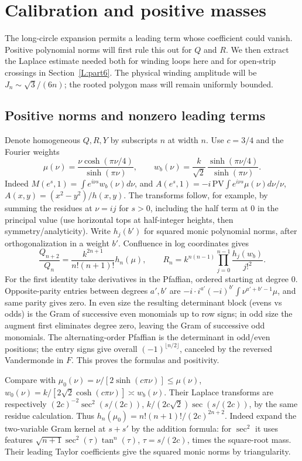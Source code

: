 \documentclass[11pt]{article}
\numberwithin{equation}{section}
\theoremstyle{definition}\newtheorem{definition}[theorem]{Definition}
\theoremstyle{remark}\newtheorem{remark}[theorem]{Remark}
\begin{document}
\section{Calibration and positive masses}\label{L:part4}

The long-circle expansion permits a leading term whose coefficient could
vanish. Positive polynomial norms will first rule this out for $Q$ and $R$.
We then extract the Laplace estimate needed both for winding loops here
and for open-strip crossings in Section~\ref{L:part6}. The physical
winding amplitude will be $J_n\sim\sqrt3/(6n)$; the rooted polygon
mass will remain uniformly bounded.

\subsection{Positive norms and nonzero leading terms}
Denote homogeneous \(Q,R,Y\) by subscripts \(n\) at width \(n\). Use \(c=3/4\) and the Fourier weights
\[
 \mu(\nu)=\frac{\nu\cosh(\pi\nu/4)}{\sinh(\pi\nu)},\qquad
 w_b(\nu)=\frac{k}{\sqrt2}\,\frac{\sinh(\pi\nu/4)}{\sinh(\pi\nu)} .
\]
Indeed \(M(e^s,1)=\int e^{i\nu s}w_b(\nu)d\nu\), and \(A(e^s,1)= -i\,\mathrm{PV}\int e^{i\nu s}\mu(\nu)d\nu/\nu\), \(A(x,y)=(x^2-y^2)/h(x,y)\). The transforms follow, for example, by summing the residues at \(\nu=i j\) for \(s>0\), including the half term at 0 in the principal value (use horizontal tops at half-integer heights, then symmetry/analyticity). Write \(h_j(b')\) for squared monic polynomial norms, after orthogonalization in a weight \(b'\). Confluence in log coordinates gives
\[
 \frac{Q_{n+2}}{Q_n}=\frac{k^{2n+1}}{n!(n+1)!} h_n(\mu),\qquad
 R_n=k^{n(n-1)}\prod_{j=0}^{n-1}\frac{h_j(w_b)}{j!^2}.
\]
For the first identity take derivatives in the Pfaffian, ordered starting at degree 0. Opposite-parity entries between degrees \(a',b'\) are \(-i\cdot i^{a'}(-i)^{b'}\int\nu^{a'+b'-1}\mu\), and same parity gives zero. In even size the resulting determinant block (evens vs odds) is the Gram of successive even monomials up to row signs; in odd size the augment first eliminates degree zero, leaving the Gram of successive odd monomials. The alternating-order Pfaffian is the determinant in odd/even positions; the entry signs give overall \((-1)^{\lfloor n/2\rfloor}\), canceled by the reversed Vandermonde in \(F\). This proves the formulas and positivity.

Compare with
\(\mu_0(\nu)=\nu/[2\sinh(c\pi\nu)]\le\mu(\nu)\),
\(w_0(\nu)=k/[2\sqrt2\cosh(c\pi\nu)]\asymp w_b(\nu)\). Their Laplace transforms are respectively \((2c)^{-2}\sec^2(s/(2c))\), \(k/(2c\sqrt2)\sec(s/(2c))\), by the same residue calculation. Thus
\(h_n(\mu_0)=n!(n+1)!/(2c)^{2n+2}\). Indeed expand the two-variable Gram kernel at \(s+s'\) by the addition formula: for \(\sec^2\) it uses features \(\sqrt{n+1}\sec^2(\tau)\tan^n(\tau)\), \(\tau=s/(2c)\), times the square-root mass. Their leading Taylor coefficients give the squared monic norms by triangularity.
\end{document}
